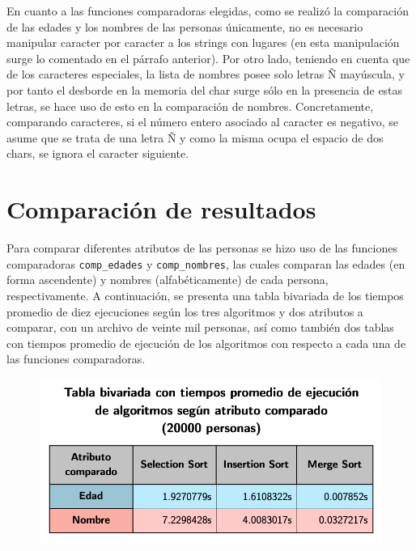 \documentclass[11pt]{article}
\begin{document}
En cuanto a las funciones comparadoras elegidas, como se realizó la comparación de las edades y los nombres de las personas únicamente, no es necesario manipular caracter por caracter a los strings con lugares (en esta manipulación surge lo comentado en el párrafo anterior). Por otro lado, teniendo en cuenta que de los caracteres especiales, la lista de nombres posee solo letras Ñ mayúscula, y por tanto el desborde en la memoria del char surge sólo en la presencia de estas letras, se hace uso de esto en la comparación de nombres. Concretamente, comparando caracteres, si el número entero asociado al caracter es negativo, se asume que se trata de una letra Ñ y como la misma ocupa el espacio de dos chars, se ignora el caracter siguiente.\par


\section{Comparación de resultados}
\vspace{-.3cm}
Para comparar diferentes atributos de las personas se hizo uso de las funciones comparadoras \verb|comp_edades| y \verb|comp_nombres|, las cuales comparan las edades (en forma ascendente) y nombres (alfabéticamente) de cada persona, respectivamente. A continuación, se presenta una tabla bivariada de los tiempos promedio de diez ejecuciones según los tres algoritmos y dos atributos a comparar, con un archivo de veinte mil personas, así como también dos tablas con tiempos promedio de ejecución de los algoritmos con respecto a cada una de las funciones comparadoras.\par
\vspace{.2cm}
\begin{figure}[h]
    \begin{center}
        \includegraphics[scale = 0.465]{TABLA_BIVARIADA}\par
    \end{center}
\end{figure}
\end{document}
